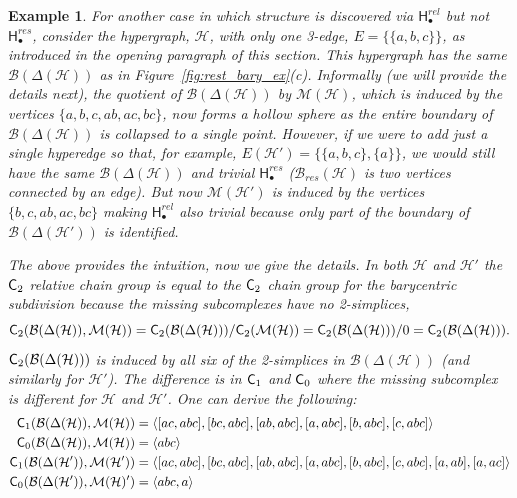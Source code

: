 \documentclass{amsart}
\newtheorem{example}[theorem]{Example}
\newcommand{\Cgroup}        {\mm{\sf C}}
\newcommand{\Hgroup}	     {\mathsf{H}}
\renewcommand{\hom}[2]{\Hgroup_{#2}^{#1}}
\renewcommand{\H}{\mathcal{H}}
\newcommand{\bary}{\mathcal{B}}
\newcommand{\missing}{\mathcal{M}}
\newcommand {\mm}[1]        {\ifmmode{#1}\else{\mbox{\(#1\)}}\fi}
\begin{document}
\begin{example}
For another case in which structure is discovered via $\hom{rel}{\bullet}$ but not $\hom{res}{\bullet}$, consider the hypergraph, $\H$, with only one 3-edge, $E = \{\{a,b,c\}\}$, as introduced in the opening paragraph of this section. 
This hypergraph has the same $\bary(\Delta(\H))$ as in Figure~\ref{fig:rest_bary_ex}(c).
Informally (we will provide the details next), the quotient of $\bary(\Delta(\H))$ by $\missing(\H)$, which is induced by the vertices $\{a, b, c, ab, ac, bc\}$, now forms a hollow sphere as the entire boundary of $\bary(\Delta(\H))$ is collapsed to a single point.
However, if we were to add just a single hyperedge so that, for example, $E(\H') = \{\{a,b,c\}, \{a\}\}$, we would still have the same $\bary(\Delta(\H))$ and trivial $\hom{res}{\bullet}$ ($\bary_{res}(\H)$ is two vertices connected by an edge). But now $\missing(\H')$ is induced by the vertices $\{b, c, ab, ac, bc\}$ making $\hom{rel}{\bullet}$ also trivial because only part of the boundary of $\bary(\Delta(\H'))$ is identified.

The above provides the intuition, now we give the details. In both $\H$ and $\H'$ the $\Cgroup_2$ relative chain group is equal to the $\Cgroup_2$ chain group for the barycentric subdivision because the missing subcomplexes have no 2-simplices,
\[\Cgroup_2(\bary(\Delta(\H)), \missing(\H)) = \Cgroup_2(\bary(\Delta(\H)))/\Cgroup_2(\missing(\H)) = \Cgroup_2(\bary(\Delta(\H)))/0 = \Cgroup_2(\bary(\Delta(\H))).\]
$\Cgroup_2(\bary(\Delta(\H)))$ is induced by all six of the 2-simplices in $\bary(\Delta(\H))$ (and similarly for $\H'$).
The difference is in $\Cgroup_1$ and $\Cgroup_0$ where the missing subcomplex is different for $\H$ and $\H'$.
One can derive the following:
\begin{align*}
    \Cgroup_1(\bary(\Delta(\H)), \missing(\H)) &= \langle [ac, abc], [bc, abc], [ab, abc], [a, abc], [b, abc],[c,abc]\rangle\\
    \Cgroup_0(\bary(\Delta(\H)), \missing(\H)) &= \langle abc \rangle\\
    \Cgroup_1(\bary(\Delta(\H')), \missing(\H')) &= \langle [ac, abc], [bc, abc], [ab, abc], [a, abc], [b, abc],[c,abc], [a, ab], [a, ac]\rangle\\
    \Cgroup_0(\bary(\Delta(\H')), \missing(\H)') &= \langle abc, a \rangle
\end{align*}


\end{example}
\end{document}
